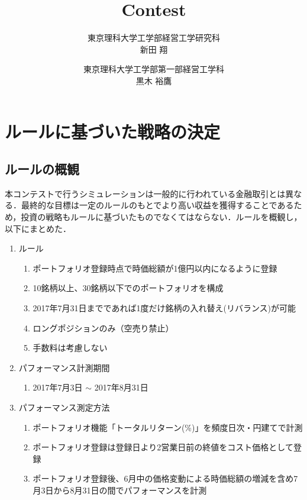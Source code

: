 \documentclass[11pt]{jreport}
\begin{document}
\title{Contest\\}
\author{東京理科大学工学部経営工学研究科\\新田 翔 \and 東京理科大学工学部第一部経営工学科\\黒木 裕鷹}
\maketitle
\begin{abstract}

\end{abstract}


\chapter{ルールに基づいた戦略の決定}
\section{ルールの概観}

本コンテストで行うシミュレーションは一般的に行われている金融取引とは異なる．最終的な目標は一定のルールのもとでより高い収益を獲得することであるため，投資の戦略もルールに基づいたものでなくてはならない．ルールを概観し，以下にまとめた．

\begin{enumerate}
\item ルール
\begin{enumerate}
\item ポートフォリオ登録時点で時価総額が1億円以内になるように登録
\item 10銘柄以上、30銘柄以下でのポートフォリオを構成
\item 2017年7月31日までであれば1度だけ銘柄の入れ替え(リバランス)が可能
\item ロングポジションのみ（空売り禁止）
\item 手数料は考慮しない
\end{enumerate}

\item パフォーマンス計測期間
\begin{enumerate}
\item  2017年7月3日 $\sim$ 2017年8月31日
\end{enumerate}

\item パフォーマンス測定方法
\begin{enumerate}
\item ポートフォリオ機能「トータルリターン(\%)」を頻度日次・円建てで計測
\item ポートフォリオ登録は登録日より2営業日前の終値をコスト価格として登録
\item ポートフォリオ登録後、6月中の価格変動による時価総額の増減を含め7月3日から8月31日の間でパフォーマンスを計測
\end{enumerate}
\end{enumerate}
\end{document}
